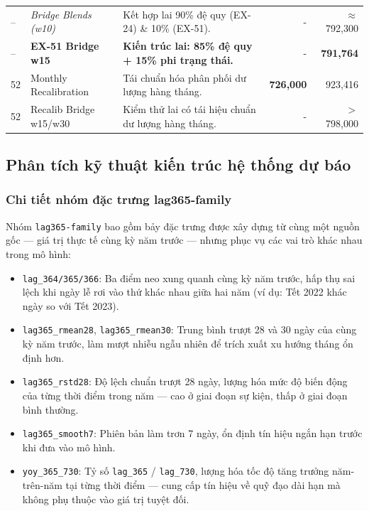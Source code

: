 \documentclass{article}
\begin{document}
\begin{table}[H]
\begin{tabular}{@{}llp{7cm}rr@{}}
-- & \textit{Bridge Blends (w10)} & Kết hợp lai 90\% đệ quy (EX-24) \& 10\% (EX-51). & - & $\approx$792,300 \\
-- & \textbf{EX-51 Bridge w15} & \textbf{Kiến trúc lai: 85\% đệ quy + 15\% phi trạng thái.} & - & \textbf{791,764} \\
52 & Monthly Recalibration & Tái chuẩn hóa phân phối dư lượng hàng tháng. & \textbf{726,000} & 923,416 \\
52 & Recalib Bridge w15/w30 & Kiểm thử lai có tái hiệu chuẩn dư lượng hàng tháng. & - & $>$798,000 \\
\bottomrule
\end{tabular}
\end{table}


\subsection{Phân tích kỹ thuật kiến trúc hệ thống dự báo}
\label{app:modeling_detail}

\subsubsection{Chi tiết nhóm đặc trưng lag365-family}

Nhóm \texttt{lag365-family} bao gồm bảy đặc trưng được xây dựng từ cùng một nguồn gốc — giá trị thực tế cùng kỳ năm trước — nhưng phục vụ các vai trò khác nhau trong mô hình:

\begin{itemize}[noitemsep, leftmargin=1.5em]
    \item \texttt{lag\_364/365/366}: Ba điểm neo xung quanh cùng kỳ năm trước, hấp thụ sai lệch khi ngày lễ rơi vào thứ khác nhau giữa hai năm (ví dụ: Tết 2022 khác ngày so với Tết 2023).
    \item \texttt{lag365\_rmean28}, \texttt{lag365\_rmean30}: Trung bình trượt 28 và 30 ngày của cùng kỳ năm trước, làm mượt nhiễu ngẫu nhiên để trích xuất xu hướng tháng ổn định hơn.
    \item \texttt{lag365\_rstd28}: Độ lệch chuẩn trượt 28 ngày, lượng hóa mức độ biến động của từng thời điểm trong năm — cao ở giai đoạn sự kiện, thấp ở giai đoạn bình thường.
    \item \texttt{lag365\_smooth7}: Phiên bản làm trơn 7 ngày, ổn định tín hiệu ngắn hạn trước khi đưa vào mô hình.
    \item \texttt{yoy\_365\_730}: Tỷ số \texttt{lag\_365} / \texttt{lag\_730}, lượng hóa tốc độ tăng trưởng năm-trên-năm tại từng thời điểm — cung cấp tín hiệu về quỹ đạo dài hạn mà không phụ thuộc vào giá trị tuyệt đối.
\end{itemize}
\end{document}
